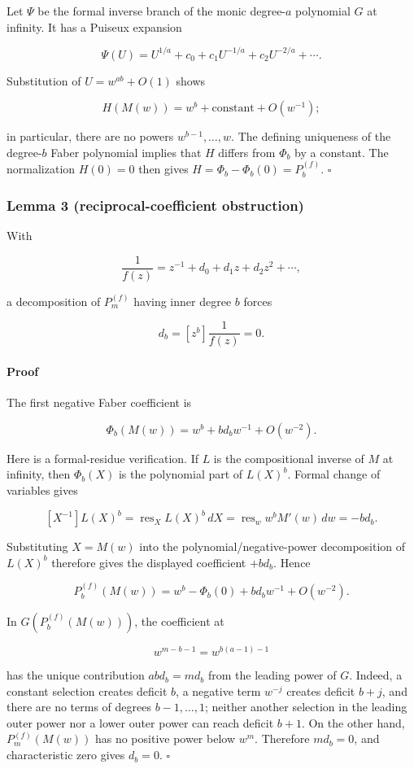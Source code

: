 Let \(\Psi\) be the formal inverse branch of the monic degree-\(a\)
polynomial \(G\) at infinity. It has a Puiseux expansion

\[
 \Psi(U)=U^{1/a}+c_0+c_1U^{-1/a}+c_2U^{-2/a}+\cdots .
\]

Substitution of \(U=w^{ab}+O(1)\) shows

\[
 H(M(w))=w^b+\text{constant}+O(w^{-1});
\]

in particular, there are no powers \(w^{b-1},\ldots,w\). The defining
uniqueness of the degree-\(b\) Faber polynomial implies that \(H\) differs
from \(\Phi_b\) by a constant. The normalization \(H(0)=0\) then gives
\(H=\Phi_b-\Phi_b(0)=P_b^{(f)}\). \(\square\)

\subsubsection{Lemma 3 (reciprocal-coefficient obstruction)}
\label{sec:reciprocal-coefficient-obstruction}

With

\[
 \frac1{f(z)}=z^{-1}+d_0+d_1z+d_2z^2+\cdots,
\]

a decomposition of \(P_m^{(f)}\) having inner degree \(b\) forces

\[
 d_b=[z^b]\frac1{f(z)}=0.
\]

\paragraph{Proof}

The first negative Faber coefficient is

\[
 \Phi_b(M(w))=w^b+b d_bw^{-1}+O(w^{-2}).
\]

Here is a formal-residue verification. If \(L\) is the compositional
inverse of \(M\) at infinity, then \(\Phi_b(X)\) is the polynomial part of
\(L(X)^b\). Formal change of variables gives

\[
 [X^{-1}]L(X)^b
 =\operatorname {res}_X L(X)^b\,dX
 =\operatorname {res}_w w^bM'(w)\,dw
 =-bd_b.
\]

Substituting \(X=M(w)\) into the polynomial/negative-power decomposition of
\(L(X)^b\) therefore gives the displayed coefficient \(+bd_b\). Hence

\[
 P_b^{(f)}(M(w))
 =w^b-\Phi_b(0)+bd_bw^{-1}+O(w^{-2}).
\]

In \(G(P_b^{(f)}(M(w)))\), the coefficient at

\[
 w^{m-b-1}=w^{b(a-1)-1}
\]

has the unique contribution \(ab d_b=md_b\) from the leading power of
\(G\). Indeed, a constant selection creates deficit \(b\), a negative term
\(w^{-j}\) creates deficit \(b+j\), and there are no terms of degrees
\(b-1,\ldots,1\); neither another selection in the leading outer power nor
a lower outer power can reach deficit \(b+1\). On the other hand,
\(P_m^{(f)}(M(w))\) has no positive power below \(w^m\). Therefore
\(md_b=0\), and characteristic zero gives \(d_b=0\). \(\square\)

